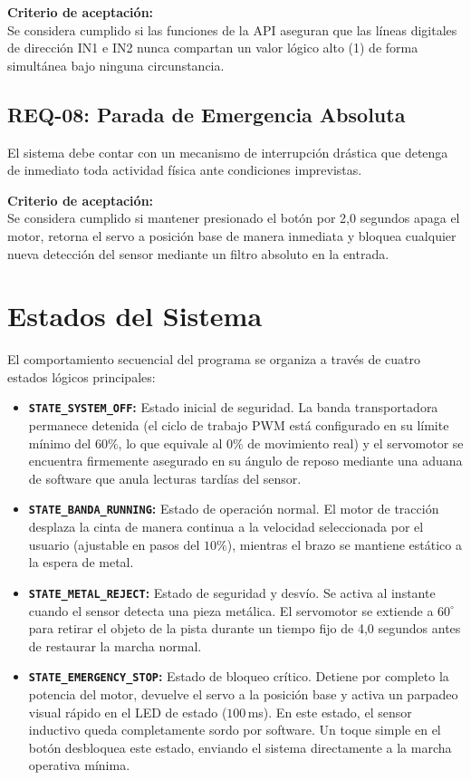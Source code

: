 \documentclass[12pt, letterpaper]{article}
\begin{document}
\vspace{0.5cm}

\noindent \textbf{Criterio de aceptación:} \\
Se considera cumplido si las funciones de la API aseguran que las líneas digitales de dirección IN1 e IN2 nunca compartan un valor lógico alto (1) de forma simultánea bajo ninguna circunstancia.

\subsection{REQ-08: Parada de Emergencia Absoluta}
El sistema debe contar con un mecanismo de interrupción drástica que detenga de inmediato toda actividad física ante condiciones imprevistas.

\vspace{0.5cm}

\noindent \textbf{Criterio de aceptación:} \\
Se considera cumplido si mantener presionado el botón por 2,0 segundos apaga el motor, retorna el servo a posición base de manera inmediata y bloquea cualquier nueva detección del sensor mediante un filtro absoluto en la entrada.

\section{Estados del Sistema}
\label{sec:estados_preliminares}

El comportamiento secuencial del programa se organiza a través de cuatro estados lógicos principales:

\begin{itemize}
    \item \textbf{\texttt{STATE\_SYSTEM\_OFF}:} Estado inicial de seguridad. La banda transportadora permanece detenida (el ciclo de trabajo PWM está configurado en su límite mínimo del $60\%$, lo que equivale al $0\%$ de movimiento real) y el servomotor se encuentra firmemente asegurado en su ángulo de reposo mediante una aduana de software que anula lecturas tardías del sensor.
    \item \textbf{\texttt{STATE\_BANDA\_RUNNING}:} Estado de operación normal. El motor de tracción desplaza la cinta de manera continua a la velocidad seleccionada por el usuario (ajustable en pasos del $10\%$), mientras el brazo se mantiene estático a la espera de metal.
    \item \textbf{\texttt{STATE\_METAL\_REJECT}:} Estado de seguridad y desvío. Se activa al instante cuando el sensor detecta una pieza metálica. El servomotor se extiende a $60^\circ$ para retirar el objeto de la pista durante un tiempo fijo de 4,0 segundos antes de restaurar la marcha normal.
    \item \textbf{\texttt{STATE\_EMERGENCY\_STOP}:} Estado de bloqueo crítico. Detiene por completo la potencia del motor, devuelve el servo a la posición base y activa un parpadeo visual rápido en el LED de estado ($100\,$ms). En este estado, el sensor inductivo queda completamente sordo por software. Un toque simple en el botón desbloquea este estado, enviando el sistema directamente a la marcha operativa mínima.
\end{itemize}
\end{document}
